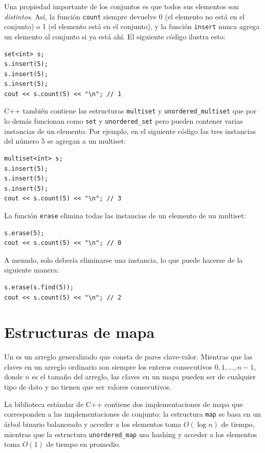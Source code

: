 Una propiedad importante de los conjuntos es
que todos sus elementos son \emph{distintos}.
Así, la función \texttt{count} siempre devuelve
0 (el elemento no está en el conjunto)
o 1 (el elemento está en el conjunto),
y la función \texttt{insert} nunca agrega
un elemento al conjunto si ya
está ahí.
El siguiente código ilustra esto:

\begin{lstlisting}
set<int> s;
s.insert(5);
s.insert(5);
s.insert(5);
cout << s.count(5) << "\n"; // 1
\end{lstlisting}

C++ también contiene las estructuras
\texttt{multiset} y \texttt{unordered\_multiset}
que por lo demás funcionan como \texttt{set}
y \texttt{unordered\_set}
pero pueden contener varias instancias de un elemento.
Por ejemplo, en el siguiente código las tres instancias
del número 5 se agregan a un multiset:

\begin{lstlisting}
multiset<int> s;
s.insert(5);
s.insert(5);
s.insert(5);
cout << s.count(5) << "\n"; // 3
\end{lstlisting}
La función \texttt{erase} elimina
todas las instancias de un elemento
de un multiset:
\begin{lstlisting}
s.erase(5);
cout << s.count(5) << "\n"; // 0
\end{lstlisting}
A menudo, solo debería eliminarse una instancia,
lo que puede hacerse de la siguiente manera:
\begin{lstlisting}
s.erase(s.find(5));
cout << s.count(5) << "\n"; // 2
\end{lstlisting}

\section{Estructuras de mapa}


Un  es un arreglo generalizado
que consta de pares clave-valor.
Mientras que las claves en un arreglo ordinario son siempre
los enteros consecutivos $0,1,\ldots,n-1$,
donde $n$ es el tamaño del arreglo,
las claves en un mapa pueden ser de cualquier tipo de dato y
no tienen que ser valores consecutivos.

La biblioteca estándar de C++ contiene dos implementaciones
de mapa que corresponden a las implementaciones
de conjunto: la estructura
\texttt{map} se basa en un árbol
binario balanceado y acceder a los elementos
toma $O(\log n)$ de tiempo,
mientras que la estructura
\texttt{unordered\_map} usa hashing
y acceder a los elementos toma $O(1)$ de tiempo en promedio.

